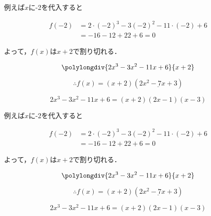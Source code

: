 \documentclass[../main]{subfiles}
\begin{document}
\begin{BRACKETBOX}


    例えば$x$に-2を代入すると

    \begin{align*}
        f(-2) &= 2\cdot (-2)^3 - 3(-2)^2 - 11\cdot (-2)+6 \\
              &= -16-12+22+6 = 0
    \end{align*}

    よって，$f(x)$は$x+2$で割り切れる．

    \begin{equation*}
        \polylongdiv{2x^3-3x^2-11x+6}{x+2}
    \end{equation*}

    \begin{equation*}
        \therefore f(x) = (x+2)(\underline{2x^2-7x+3})
    \end{equation*}

    \begin{equation*}
        2x^3-3x^2-11x+6 = (x+2)(2x-1)(x-3)
    \end{equation*}
        
\end{BRACKETBOX}
\begin{code}[language=tex]
\begin{BRACKETBOX}


    例えば$x$に-2を代入すると

    \begin{align*}
        f(-2) &= 2\cdot (-2)^3 - 3(-2)^2 - 11\cdot (-2)+6 \\
                &= -16-12+22+6 = 0
    \end{align*}

    よって，$f(x)$は$x+2$で割り切れる．

    \begin{equation*}
        \polylongdiv{2x^3-3x^2-11x+6}{x+2}
    \end{equation*}

    \begin{equation*}
        \therefore f(x) = (x+2)(\underline{2x^2-7x+3})
    \end{equation*}

    \begin{equation*}
        2x^3-3x^2-11x+6 = (x+2)(2x-1)(x-3)
    \end{equation*}
        
\end{BRACKETBOX}
\end{code}
\end{document}
